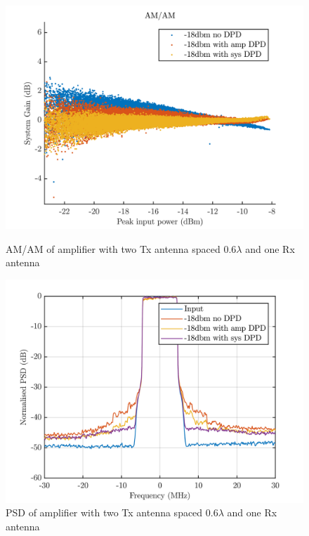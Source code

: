 \begin{figure}[H]
  \centering
  \begin{minipage}[b]{0.5\textwidth}
	\includegraphics[scale = 0.5]{figures/measurement/cree/two/amam_two_ant_0p6.png}
	\caption{AM/AM of amplifier with two Tx antenna spaced $0.6\lambda$ and one Rx antenna}
    \label{fig:cree_amam_two_ant5}
  \end{minipage}
  \hfill
  \begin{minipage}[b]{0.4\textwidth}
\includegraphics[scale = 0.5]{figures/measurement/cree/two/psd_two_ant_0p1.png}
\caption{PSD of amplifier with two Tx antenna spaced $0.6\lambda$ and one Rx antenna}
    \label{fig:cree_psd_two_ant5}
  \end{minipage}
\end{figure}

